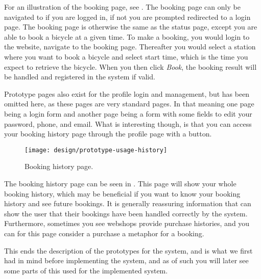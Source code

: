 For an illustration of the booking page, see .
The booking page can only be navigated to if you are logged in, if not you are prompted redirected to a login page.
The booking page is otherwise the same as the status page, except you are able to book a bicycle at a given time.
To make a booking, you would login to the website, navigate to the booking page.
Thereafter you would select a station where you want to book a bicycle and select start time, which is the time you expect to retrieve the bicycle.
When you then click \textit{Book}, the booking result will be handled and registered in the system if valid.

Prototype pages also exist for the profile login and management, but has been omitted here, as these pages are very standard pages.
In that meaning one page being a login form and another page being a form with some fields to edit your password, phone, and email.
What is interesting though, is that you can access your booking history page through the profile page with a button.

\begin{figure}[h]
	\centering
	\texttt{[image: design/prototype-usage-history]}
	\caption{Booking history page.}\label{fig:prototype-usage-history}
\end{figure}

The booking history page can be seen in .
This page will show your whole booking history, which may be beneficial if you want to know your booking history and see future bookings.
It is generally reassuring information that can show the user that their bookings have been handled correctly by the system.
Furthermore, sometimes you see webshops provide purchase histories, and you can for this page consider a purchase a metaphor for a booking.

This ends the description of the prototypes for the system, and is what we first had in mind before implementing the system, and as of such you will later see some parts of this used for the implemented system.